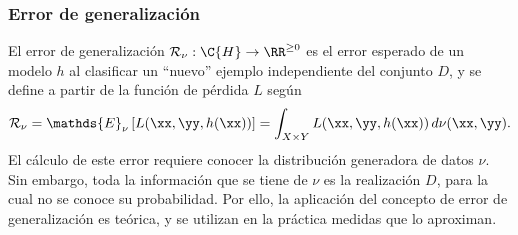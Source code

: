 %
\subsubsection{Error de generalización}
%
El error de generalización
$\mathcal{R}_\nu:\C{H}\rightarrow\RR^{\geq0}$ es el error esperado de
un modelo $h$ al clasificar un ``nuevo'' ejemplo independiente
del conjunto $D$, y se define a partir de la función de pérdida $L$ según
%
\begin{align}
  \mathcal{R}_\nu=\mathds{E}_\nu\left[L(\xx,\yy,h(\xx))\right]
  =\int_{X\times Y} L(\xx,\yy,h(\xx))\, d\nu(\xx,\yy).
\end{align}
%
El cálculo de este error requiere conocer la distribución generadora
de datos $\nu$.
Sin embargo, toda la información que se tiene de $\nu$
es la realización $D$, para la cual no se conoce su probabilidad.
Por ello, la aplicación del concepto de error de generalización es
teórica, y se utilizan en la práctica medidas que lo aproximan.
